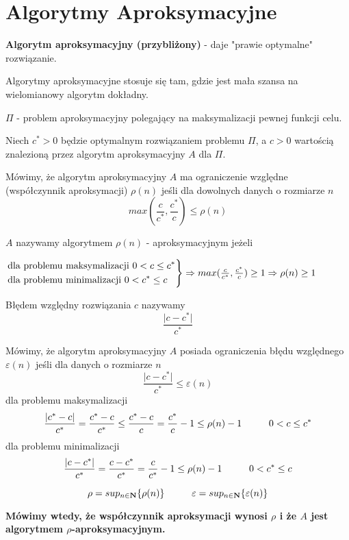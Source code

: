 \section{Algorytmy Aproksymacyjne}
\textbf{Algorytm aproksymacyjny (przybliżony)} - daje "prawie optymalne" rozwiązanie.

Algorytmy aproksymacyjne stosuje się tam, gdzie jest mała szansa na wielomianowy algorytm dokładny.

$\Pi$ - problem aproksymacyjny polegający na maksymalizacji pewnej funkcji celu.

Niech $c^{\ast} > 0$ będzie optymalnym rozwiązaniem problemu $\Pi$, a $c > 0$ wartością znalezioną przez algorytm aproksymacyjny $A$ dla $\Pi$.

Mówimy, że algorytm aproksymacyjny $A$ ma ograniczenie względne (współczynnik aproksymacji) $\rho (n)$ jeśli dla dowolnych danych o rozmiarze $n$ $$max(\frac{c}{c^{\ast}},\frac{c^{\ast}}{c}) \leq \rho (n)$$

$A$ nazywamy algorytmem $\rho(n)$ - aproksymacyjnym jeżeli 
\begin{center}
	$\begin{drcases}
		\text{dla problemu maksymalizacji } 0<c\leq c^{\ast}\\
		\text{dla problemu minimalizacji } 0<c^{\ast}\leq c
	\end{drcases} 
	\Rightarrow max(\frac{c}{c^{\ast}},\frac{c^{\ast}}{c})\geq 1 \Rightarrow \rho(n) \geq 1$
\end{center}

Błędem względny rozwiązania $c$ nazywamy $$\frac{\vert c-c^{\ast} \vert}{c^{\ast}}$$

Mówimy, że algorytm aproksymacyjny $A$ posiada ograniczenia błędu  względnego $\varepsilon (n)$ jeśli dla danych o rozmiarze $n$ $$\frac{\vert c-c^{\ast}\vert}{c^{\ast}} \leq \varepsilon (n)$$ 
dla problemu maksymalizacji 
$$	\frac{\vert c^{\ast} - c\vert}{c^{\ast}} 
	= \frac{c^\ast - c}{c^\ast}
	\leq \frac{c^\ast - c}{c}
	= \frac{c^{\ast}}{c} - 1 
	\leq \rho(n) - 1 
	\hspace*{1cm} 0 < c \leq c^{\ast} $$
dla problemu minimalizacji 
$$	\frac{\vert c - c^{\ast}\vert}{c^{\ast}} 
	= \frac{c - c^{\ast}}{c^\ast} 
	= \frac{c}{c^{\ast}} - 1 
	\leq \rho(n) - 1 
	\hspace*{1cm} 0 < c^{\ast} \leq c $$

$$
\rho = sup_{n \in \mathbf{N}}
	\lbrace \rho(n) \rbrace 
\hspace*{1cm} 
\varepsilon = sup_{n \in \mathbf{N}} 
	\lbrace\varepsilon (n) \rbrace
$$

\textbf{Mówimy wtedy, że współczynnik aproksymacji wynosi $\rho$ i że $A$ jest algorytmem $\rho$-aproksymacyjnym.}